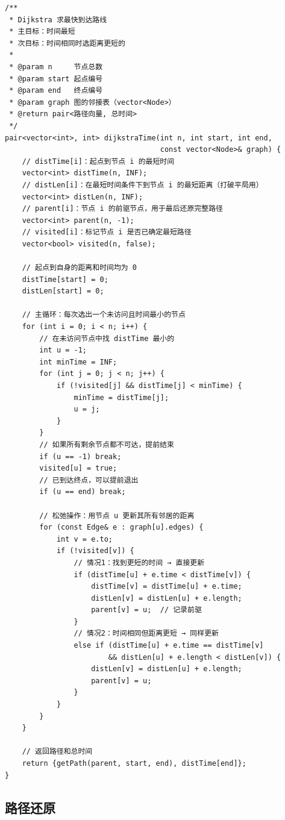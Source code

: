 \documentclass[12pt,a4paper]{article}
\begin{document}
\begin{lstlisting}
/**
 * Dijkstra 求最快到达路线
 * 主目标：时间最短
 * 次目标：时间相同时选距离更短的
 *
 * @param n     节点总数
 * @param start 起点编号
 * @param end   终点编号
 * @param graph 图的邻接表（vector<Node>）
 * @return pair<路径向量, 总时间>
 */
pair<vector<int>, int> dijkstraTime(int n, int start, int end,
                                    const vector<Node>& graph) {
    // distTime[i]：起点到节点 i 的最短时间
    vector<int> distTime(n, INF);
    // distLen[i]：在最短时间条件下到节点 i 的最短距离（打破平局用）
    vector<int> distLen(n, INF);
    // parent[i]：节点 i 的前驱节点，用于最后还原完整路径
    vector<int> parent(n, -1);
    // visited[i]：标记节点 i 是否已确定最短路径
    vector<bool> visited(n, false);

    // 起点到自身的距离和时间均为 0
    distTime[start] = 0;
    distLen[start] = 0;

    // 主循环：每次选出一个未访问且时间最小的节点
    for (int i = 0; i < n; i++) {
        // 在未访问节点中找 distTime 最小的
        int u = -1;
        int minTime = INF;
        for (int j = 0; j < n; j++) {
            if (!visited[j] && distTime[j] < minTime) {
                minTime = distTime[j];
                u = j;
            }
        }
        // 如果所有剩余节点都不可达，提前结束
        if (u == -1) break;
        visited[u] = true;
        // 已到达终点，可以提前退出
        if (u == end) break;

        // 松弛操作：用节点 u 更新其所有邻居的距离
        for (const Edge& e : graph[u].edges) {
            int v = e.to;
            if (!visited[v]) {
                // 情况1：找到更短的时间 → 直接更新
                if (distTime[u] + e.time < distTime[v]) {
                    distTime[v] = distTime[u] + e.time;
                    distLen[v] = distLen[u] + e.length;
                    parent[v] = u;  // 记录前驱
                }
                // 情况2：时间相同但距离更短 → 同样更新
                else if (distTime[u] + e.time == distTime[v]
                        && distLen[u] + e.length < distLen[v]) {
                    distLen[v] = distLen[u] + e.length;
                    parent[v] = u;
                }
            }
        }
    }

    // 返回路径和总时间
    return {getPath(parent, start, end), distTime[end]};
}
\end{lstlisting}

\subsection{路径还原}
\end{document}
